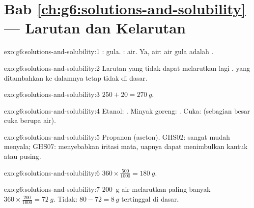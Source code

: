 \section*{Bab \ref{ch:g6:solutions-and-solubility} --- Larutan dan Kelarutan}

\begin{solution}{exo:g6:solutions-and-solubility:1}
: gula. : air. Ya,  air: air gula adalah
.
\end{solution}

\begin{solution}{exo:g6:solutions-and-solubility:2}
Larutan yang tidak dapat melarutkan lagi . 
yang ditambahkan ke dalamnya tetap tidak  di dasar.
\end{solution}

\begin{solution}{exo:g6:solutions-and-solubility:3}
$250 + 20 = \qty{270}{g}$.
\end{solution}

\begin{solution}{exo:g6:solutions-and-solubility:4}
Etanol: . Minyak goreng: . Cuka:
 (sebagian besar cuka berupa air).
\end{solution}

\begin{solution}{exo:g6:solutions-and-solubility:5}
Propanon (aseton). GHS02: sangat mudah menyala; GHS07: menyebabkan
iritasi mata, uapnya dapat menimbulkan kantuk atau pusing.
\end{solution}

\begin{solution}{exo:g6:solutions-and-solubility:6}
$360 \times \frac{500}{1000} = \qty{180}{g}$.
\end{solution}

\begin{solution}{exo:g6:solutions-and-solubility:7}
\qty{200}{g} air melarutkan paling banyak $360 \times \frac{200}{1000} =
\qty{72}{g}$. Tidak: $80 - 72 = \qty{8}{g}$ tertinggal di dasar.
\end{solution}

